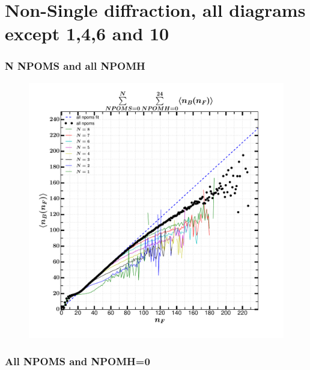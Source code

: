 \documentclass[]{article}
\begin{document}
\newpage

\section*{\centering Non-Single diffraction, all diagrams except 1,4,6 and 10}

\subsubsection*{\centering N NPOMS and all NPOMH}
\begin{figure}[h!]
\centering
\includegraphics[scale=0.5]{../analyzed/nsd_nbnf_Nnpoms_allnpomh.pdf}
    \caption[NSD All NPOMS and NPOMH=0]{}
\end{figure}

\newpage
\subsubsection*{\centering All NPOMS and NPOMH=0}
\end{document}
